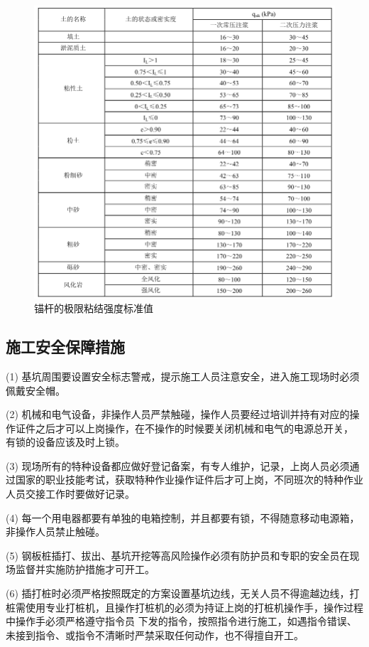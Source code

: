 \begin{figure}[thbp!]
    \centering
    \includegraphics[width=0.8\linewidth]{figure/c8f3.png}
    \caption{锚杆的极限粘结强度标准值}
    \label{fig:c8f3}
\end{figure}

\subsection{施工安全保障措施}

(1) 基坑周围要设置安全标志警戒，提示施工人员注意安全，进入施工现场时必须佩戴安全帽。

(2) 机械和电气设备，非操作人员严禁触碰，操作人员要经过培训并持有对应的操作证件之后才可以上岗操作，在不操作的时候要关闭机械和电气的电源总开关，
有锁的设备应该及时上锁。

(3) 现场所有的特种设备都应做好登记备案，有专人维护，记录，上岗人员必须通过国家的职业技能考试，获取特种作业操作证件后才可上岗，不同班次的特种作业人员交接工作时要做好记录。

(4) 每一个用电器都要有单独的电箱控制，并且都要有锁，不得随意移动电源箱，非操作人员禁止触碰。

(5) 钢板桩插打、拔出、基坑开挖等高风险操作必须有防护员和专职的安全员在现场监督并实施防护措施才可开工。

(6) 插打桩时必须严格按照既定的方案设置基坑边线，无关人员不得逾越边线，打桩需使用专业打桩机，且操作打桩机的必须为持证上岗的打桩机操作手，操作过程中操作手必须严格遵守指令员
下发的指令，按照指令进行施工，如遇指令错误、未接到指令、或指令不清晰时严禁采取任何动作，也不得擅自开工。

